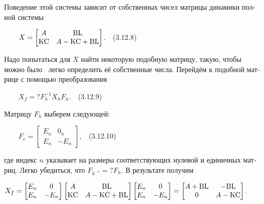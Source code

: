 \documentclass[a4paper]{article}
\newcommand\normalsubformula[1]{\text{\mathversion{normal}$#1$}}
\begin{document}
{\begin{russian}\sffamily
Поведение этой системы зависит от собственных чисел матрицы динамики полной системы
\end{russian}}

{\begin{russian}\sffamily
\ \ \ \ 
$X=\left[\begin{matrix}A&\normalsubformula{\text{BL}}\\\normalsubformula{\text{KC}}&A-\normalsubformula{\text{KC}}+\normalsubformula{\text{BL}}\end{matrix}\right]$.\ \ (3.12.8)
\end{russian}}

{\begin{russian}\sffamily
Надо попытаться для  $X$ найти некоторую подобную матрицу, такую, чтобы можно было \ легко определить её собственные
числа. Перейдём к подобной матрице с помощью преобразования
\end{russian}}

{\begin{russian}\sffamily
\ \ \ \  $X_f=?F_h^{-1}X_hF_h$.\ \ (3.12.9)
\end{russian}}

{\begin{russian}\sffamily
Матрицу  $F_h$ выберем следующей:
\end{russian}}

{\begin{russian}\sffamily
\ \ \ \  $F_e=\left[\begin{matrix}E_n&0_n\\E_n&-E_n\end{matrix}\right]$,\ \ (3.12.10)
\end{russian}}

{\begin{russian}\sffamily
где индекс  $n$ указывает на размеры соответствующих нулевой и единичных матриц. Легко убедиться, что 
$F_{h^{-1}}=?F_h$. В результате полу­чим
\end{russian}}

{\begin{russian}\sffamily

$X_f=\left[\begin{matrix}E_n&0\\E_n&-E_n\end{matrix}\right]\left[\begin{matrix}A&\normalsubformula{\text{BL}}\\\normalsubformula{\text{KC}}&A-\normalsubformula{\text{KC}}+\normalsubformula{\text{BL}}\end{matrix}\right]\left[\begin{matrix}E_n&0\\E_n&-E_n\end{matrix}\right]=\left[\begin{matrix}A+\normalsubformula{\text{BL}}&-\normalsubformula{\text{BL}}\\0&A-\normalsubformula{\text{KC}}\end{matrix}\right]$.
\end{russian}}
\end{document}

